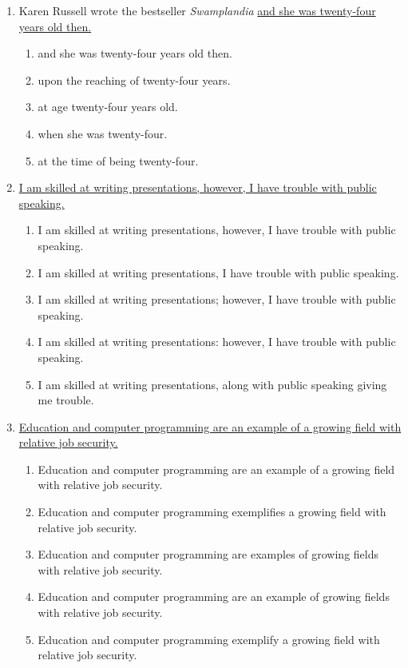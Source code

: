\begin{enumerate}
\bigskip
\item Karen Russell wrote the bestseller \textit{Swamplandia} \underline{and she was twenty-four years old then.}
\begin{enumerate}[label=(\Alph*)]
\item and she was twenty-four years old then.
\item upon the reaching of twenty-four years.
\item at age twenty-four years old.
\item when she was twenty-four.
\item at the time of being twenty-four.
\end{enumerate}

\bigskip
\item \underline{I am skilled at writing presentations, however, I have trouble with public speaking.}
\begin{enumerate}[label=(\Alph*)]
\item I am skilled at writing presentations, however, I have trouble with public speaking.
\item I am skilled at writing presentations, I have trouble with public speaking.
\item I am skilled at writing presentations; however, I have trouble with public speaking.
\item I am skilled at writing presentations: however, I have trouble with public speaking.
\item I am skilled at writing presentations, along with public speaking giving me trouble.
\end{enumerate}

\newpage
\item \ul{Education and computer programming are an example of a growing field with relative job security.}
\begin{enumerate}[label=(\Alph*)]
\item Education and computer programming are an example of a growing field with relative job security.
\item Education and computer programming exemplifies a growing field with relative job security.
\item Education and computer programming are examples of growing fields with relative job security.
\item Education and computer programming are an example of growing fields with relative job security. 
\item Education and computer programming exemplify a growing field with relative job security.
\end{enumerate}


\end{enumerate}
